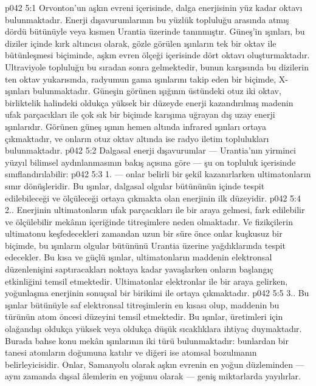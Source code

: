 \vs p042 5:1 Orvonton’un aşkın evreni içerisinde, dalga enerjisinin yüz kadar oktavı bulunmaktadır. Enerji dışavurumlarının bu yüzlük topluluğu arasında atmış dördü bütünüyle veya kısmen Urantia üzerinde tanınmıştır. Güneş’in ışınları, bu diziler içinde kırk altıncısı olarak, gözle görülen ışınların tek bir oktav ile bütünleşmesi biçiminde, aşkın evren ölçeği içerisinde dört oktavı oluşturmaktadır. Ultraviyole topluluğu bu sıradan sonra gelmektedir, bunun karşısında bu dizilerin ten oktav yukarısında, radyumun gama ışınlarını takip eden bir biçimde, X\hyp{}ışınları bulunmaktadır. Güneşin görünen ışığının üstündeki otuz iki oktav, birliktelik halindeki oldukça yüksek bir düzeyde enerji kazandırılmış madenin ufak parçacıkları ile çok sık bir biçimde karışıma uğrayan dış uzay enerji ışınlarıdır. Görünen güneş ışının hemen altında infrared ışınları ortaya çıkmaktadır, ve onların otuz oktav altında ise radyo iletim toplulukları bulunmaktadır.
\vs p042 5:2 Dalgasal enerji dışavurumlar --- Urantia’nın yirminci yüzyıl bilimsel aydınlanmasının bakış açısına göre --- şu on topluluk içerisinde sınıflandırılabilir:
\vs p042 5:3 1.\bibnobreakspace {} --- onlar belirli bir şekil kazanırlarken ultimatonların sınır dönüşleridir. Bu ışınlar, dalgasal olgular bütününün içinde tespit edilebileceği ve ölçüleceği ortaya çıkmakta olan enerjinin ilk düzeyidir.
\vs p042 5:4 2.\bibnobreakspace {}. Enerjinin ultimatonların ufak parçacıkları ile bir araya gelmesi, fark edilebilir ve ölçülebilir mekânın içeriğinde titreşimlere neden olmaktadır. Ve fizikçilerin ultimatonu keşfedecekleri zamandan uzun bir süre önce onlar kuşkusuz bir biçimde, bu ışınların olgular bütününü Urantia üzerine yağdıklarında tespit edecekler. Bu kısa ve güçlü ışınlar, ultimatonların maddenin elektronsal düzenlenişini saptıracakları noktaya kadar yavaşlarken onların başlangıç etkinliğini temsil etmektedir. Ultimatonlar elektronlar ile bir araya gelirken, yoğunlaşma enerjinin sonuçsal bir birikimi ile ortaya çıkmaktadır.
\vs p042 5:5 3.\bibnobreakspace {}. Bu ışınlar bütünüyle saf elektronsal titreşimlerin en kısası olup, maddenin bu türünün atom öncesi düzeyini temsil etmektedir. Bu ışınlar, üretimleri için olağandışı oldukça yüksek veya oldukça düşük sıcaklıklara ihtiyaç duymaktadır. Burada bahse konu mekân ışınlarının iki türü bulunmaktadır: bunlardan bir tanesi atomların doğumuna katılır ve diğeri ise atomsal bozulmanın belirleyicisidir. Onlar, Samanyolu olarak aşkın evrenin en yoğun düzleminden --- aynı zamanda dışsal âlemlerin en yoğunu olarak --- geniş miktarlarda yayılırlar.
